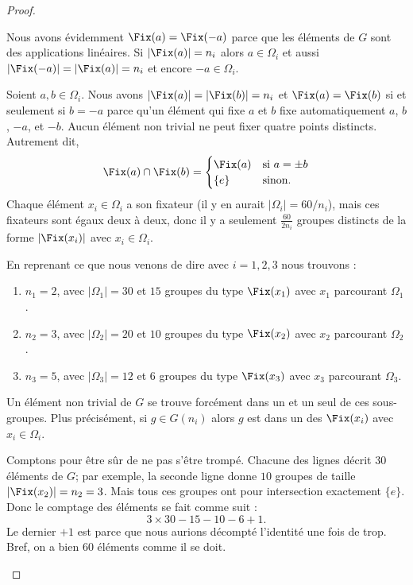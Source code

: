 \begin{proof}
\begin{subproof}

		Nous avons évidemment \( \Fix(a)=\Fix(-a)\) parce que les éléments de \( G\) sont des applications linéaires. Si \( | \Fix(a) |=n_i\) alors \( a\in\Omega_i\) et aussi \( | \Fix(-a) |=| \Fix(a) |=n_i \) et encore \( -a\in \Omega_i\).

		Soient \( a,b\in \Omega_i\). Nous avons \( | \Fix(a) |=| \Fix(b) |=n_i\) et \( \Fix(a)=\Fix(b)\) si et seulement si \( b=-a\) parce qu'un élément qui fixe \( a\) et \( b\) fixe automatiquement \( a\), \( b\), \( -a\), et \( -b\). Aucun élément non trivial ne peut fixer quatre points distincts. Autrement dit,
		\begin{equation}
			\Fix(a)\cap\Fix(b)=\begin{cases}
				\Fix(a) & \text{si } a=\pm b \\
				\{ e \} & \text{sinon. }
			\end{cases}
		\end{equation}
		Chaque élément \( x_i\in \Omega_i\) a son fixateur (il y en aurait \( | \Omega_i |=60/n_i\)), mais ces fixateurs sont égaux deux à deux, donc il y a seulement \( \frac{ 60 }{ 2n_i }\) groupes distincts de la forme \( | \Fix(x_i) |\) avec \( x_i\in \Omega_i\).

		\spitem[Récapitulatif]
		En reprenant ce que nous venons de dire avec \( i=1,2,3\) nous trouvons :
		\begin{enumerate}
			\item
			      \( n_1=2\), avec \( | \Omega_1 |=30\) et \( 15\) groupes du type \( \Fix(x_1)\) avec \( x_1\) parcourant \( \Omega_1\).
			\item
			      \( n_2=3\), avec \( | \Omega_2 |=20\) et \( 10\) groupes du type \( \Fix(x_2)\) avec \( x_2\) parcourant \( \Omega_2\).
			\item
			      \( n_3=5\), avec \( | \Omega_3|=12\) et \( 6\) groupes du type \( \Fix(x_3)\) avec \( x_3\) parcourant \( \Omega_3\).
		\end{enumerate}
		Un élément non trivial de \( G\) se trouve forcément dans un et un seul de ces sous-groupes. Plus précisément, si \( g\in G(n_i)\) alors \( g\) est dans un des \( \Fix(x_i)\) avec \( x_i\in \Omega_i\).

		Comptons pour être sûr de ne pas s'être trompé. Chacune des lignes décrit \( 30\) éléments de \( G\); par exemple, la seconde ligne donne \( 10\) groupes de taille \( | \Fix(x_2) |=n_2=3\). Mais tous ces groupes ont pour intersection exactement \( \{ e \}\). Donc le comptage des éléments se fait comme suit :
		\begin{equation}
			3\times 30-15-10-6+1.
		\end{equation}
		Le dernier \( +1\) est parce que nous aurions décompté l'identité une fois de trop. Bref, on a bien \( 60\) éléments comme il se doit.


\end{subproof}
\end{proof}
